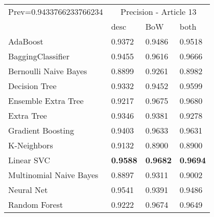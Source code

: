 \begin{tabular}{|l|l|l|l| }
\hline
Prev=0.9433766233766234 &  \multicolumn{3}{c|}{Precision - Article 13} \\
\cline{2-4} & desc & BoW & both \\ \hline
AdaBoost                & 0.9372 & 0.9486 & 0.9518\\
BaggingClassifier       & 0.9455 & 0.9616 & 0.9666\\
Bernoulli Naive Bayes   & 0.8899 & 0.9261 & 0.8982\\
Decision Tree           & 0.9332 & 0.9452 & 0.9599\\
Ensemble Extra Tree     & 0.9217 & 0.9675 & 0.9680\\
Extra Tree              & 0.9346 & 0.9381 & 0.9278\\
Gradient Boosting       & 0.9403 & 0.9633 & 0.9631\\
K-Neighbors             & 0.9132 & 0.8900 & 0.8900\\
Linear SVC              & {\bf 0.9588} & {\bf 0.9682} & {\bf 0.9694}\\
Multinomial Naive Bayes & 0.8897 & 0.9311 & 0.9002\\
Neural Net              & 0.9541 & 0.9391 & 0.9486\\
Random Forest           & 0.9222 & 0.9674 & 0.9649\\
\hline
\end{tabular}